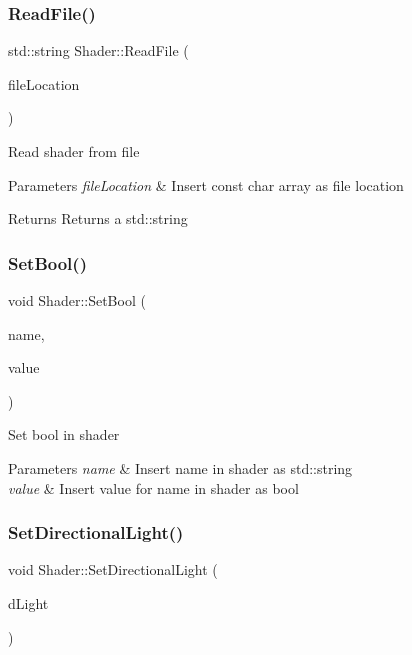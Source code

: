 \subsubsection{\texorpdfstring{ReadFile()}{ReadFile()}}
{\footnotesize\ttfamily std\+::string Shader\+::\+Read\+File (\begin{DoxyParamCaption}\item[{const char $\ast$}]{file\+Location }\end{DoxyParamCaption})}

Read shader from file 
\begin{DoxyParams}{Parameters}
{\em file\+Location} & Insert const char array as file location \\
\hline
\end{DoxyParams}
\begin{DoxyReturn}{Returns}
Returns a std\+::string 
\end{DoxyReturn}
\mbox{\label{class_shader_a1748c0c01d58bd7de586cfefc02a54ed}} 
\subsubsection{\texorpdfstring{SetBool()}{SetBool()}}
{\footnotesize\ttfamily void Shader\+::\+Set\+Bool (\begin{DoxyParamCaption}\item[{std\+::string}]{name,  }\item[{bool}]{value }\end{DoxyParamCaption})}

Set bool in shader 
\begin{DoxyParams}{Parameters}
{\em name} & Insert name in shader as std\+::string \\
\hline
{\em value} & Insert value for \textquotesingle{}name\textquotesingle{} in shader as bool \\
\hline
\end{DoxyParams}
\mbox{\label{class_shader_af613b325ed68db8b9922a07c7787cbbb}} 
\subsubsection{\texorpdfstring{SetDirectionalLight()}{SetDirectionalLight()}}
{\footnotesize\ttfamily void Shader\+::\+Set\+Directional\+Light (\begin{DoxyParamCaption}\item[{\mbox{\hyperlink{class_directional_light}{Directional\+Light}} $\ast$}]{d\+Light }\end{DoxyParamCaption})}

